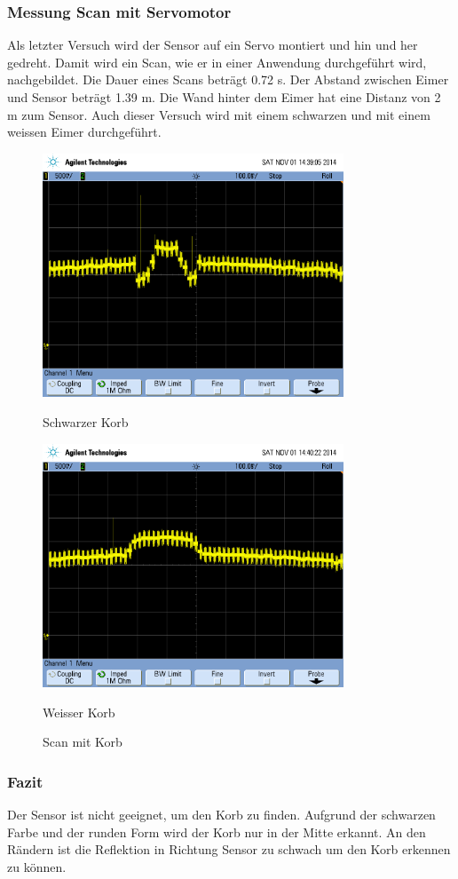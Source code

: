 \subsubsection{Messung Scan mit Servomotor}
Als letzter Versuch wird der Sensor auf ein Servo montiert und hin und her 
gedreht. Damit wird ein Scan, wie er in einer Anwendung durchgeführt wird, 
nachgebildet. Die Dauer eines Scans beträgt 0.72 s. Der Abstand zwischen 
Eimer und Sensor beträgt 1.39 m. Die Wand hinter dem Eimer hat eine Distanz 
von 2 m zum Sensor. Auch dieser Versuch wird mit einem schwarzen und mit einem 
weissen Eimer durchgeführt. 
\begin{figure}[h!]
    \begin{minipage}{0.5\textwidth}
        \centering
        \includegraphics[width=0.8\textwidth]{fig/scope_80.png}
        \caption*{Schwarzer Korb}
        \label{fig:scan_ir_black}
    \end{minipage}
    \begin{minipage}{0.5\textwidth}
        \centering
        \includegraphics[width=0.8\textwidth]{fig/scope_82.png}
        \caption*{Weisser Korb}
        \label{fig:scan_ir_white}
    \end{minipage}
    \caption{Scan mit Korb}
    \label{fig:scan_ir}
\end{figure}

\subsubsection{Fazit}
Der Sensor ist nicht geeignet, um den Korb zu finden. Aufgrund der schwarzen 
Farbe und der runden Form wird der Korb nur in der Mitte erkannt. An den 
Rändern ist die Reflektion in Richtung Sensor zu schwach um den Korb erkennen 
zu können. 

